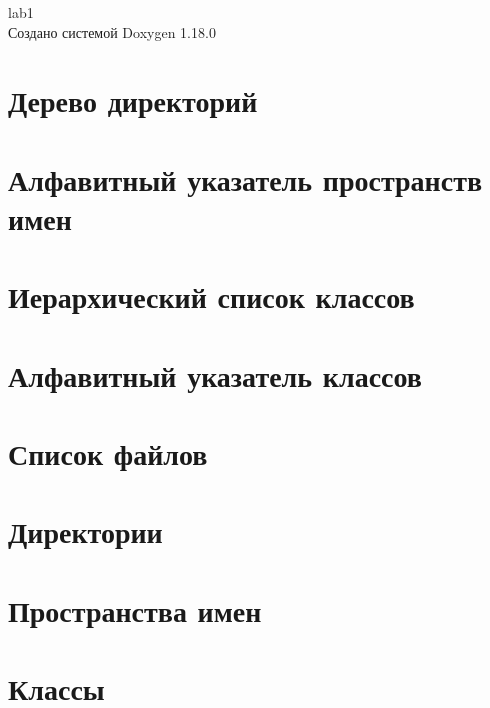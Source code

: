 \documentclass[twoside]{book}
\newcommand{\+}{\discretionary{\mbox{\scriptsize$\hookleftarrow$}}{}{}}
\newcommand{\clearemptydoublepage}{%
    \newpage{\pagestyle{empty}\cleardoublepage}%
  }
\begin{document}
  \raggedbottom
    \hypersetup{pageanchor=false,
                bookmarksnumbered=true,
                pdfencoding=unicode
               }
  \begin{titlepage}
  \vspace*{7cm}
  \begin{center}%
  {\Large lab1}\\
  \vspace*{1cm}
  {\large Создано системой Doxygen 1.18.0}\\
  \end{center}
  \end{titlepage}
  \clearemptydoublepage
  \tableofcontents
  \clearemptydoublepage
  \hypersetup{pageanchor=true}
\chapter{Дерево директорий}

\chapter{Алфавитный указатель пространств имен}

\chapter{Иерархический список классов}

\chapter{Алфавитный указатель классов}

\chapter{Список файлов}

\chapter{Директории}

\chapter{Пространства имен}

\chapter{Классы}





\end{document}
